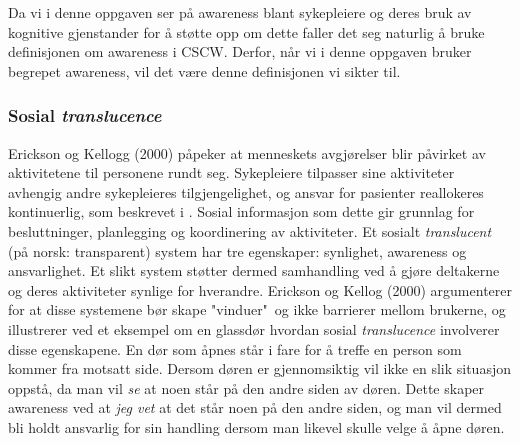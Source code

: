 \noindent
Da vi i denne oppgaven ser på awareness blant sykepleiere og deres bruk av kognitive gjenstander for å støtte opp om dette faller det seg naturlig å bruke definisjonen om awareness i CSCW. Derfor, når vi i denne oppgaven bruker begrepet awareness, vil det være denne definisjonen vi sikter til.

\subsubsection{Sosial \emph{translucence}}
Erickson og Kellogg (2000) påpeker at menneskets avgjørelser blir påvirket av aktivitetene til personene rundt seg. Sykepleiere tilpasser sine aktiviteter avhengig andre sykepleieres tilgjengelighet, og ansvar for pasienter reallokeres kontinuerlig, som beskrevet i \cite{KlemetsRedundancy}. Sosial informasjon som dette gir grunnlag for besluttninger, planlegging og koordinering av aktiviteter. Et sosialt \emph{translucent} (på norsk: transparent) system har tre egenskaper: synlighet, awareness og ansvarlighet. Et slikt system støtter dermed samhandling ved å gjøre deltakerne og deres aktiviteter synlige for hverandre. Erickson og Kellog (2000) argumenterer for at disse systemene bør skape "vinduer"\ og ikke barrierer mellom brukerne, og illustrerer ved et eksempel om en glassdør hvordan sosial \emph{translucence} involverer disse egenskapene. En dør som åpnes står i fare for å treffe en person som kommer fra motsatt side. Dersom døren er gjennomsiktig vil ikke en slik situasjon oppstå, da man vil \emph{se} at noen står på den andre siden av døren. Dette skaper awareness ved at \emph{jeg vet} at det står noen på den andre siden, og man vil dermed bli holdt ansvarlig for sin handling dersom man likevel skulle velge å åpne døren.